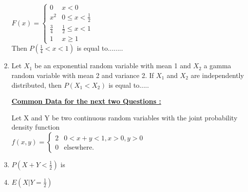 \documentclass[journal,12pt,twocolumn]{IEEEtran}
\begin{document}
\begin{enumerate}
$
F(x)= 
\begin{cases}
0 & x<0 \\
x^2 & 0 \leqslant x < \frac{1}{2} \\
\frac{3}{4} & \frac{1}{2} \leqslant x < 1 \\
1 & x \geqslant 1
\end{cases}
$ \\

Then $P({\frac{1}{4}}<x<1)$ is equal to........
\\
\solution


\item Let $X_1$ be an exponential random variable with mean 1 and $X_2$ a gamma random variable with mean 2 and variance 2. If $X_1$ and $X_2$ are independently distributed, then $P(X_1<X_2)$ is equal to.....

\begin{center}
\centering\underline{\textbf{Common Data for the next two Questions :}}
\end{center}

Let X and Y be two continuous random variables with the joint probability density function \\
$
f(x,y)= 
\begin{cases}
2 & 0<x+y<1, x>0, y>0 \\
0 & \text{elsewhere}.
\end{cases}
$

\item $P(X+Y<\frac{1}{2})$ is

\begin{enumerate}
\end{enumerate}

\item $E(X|Y=\frac{1}{2})$

\begin{enumerate}
\end{enumerate}
%
\solution



\end{enumerate}
\end{document}
